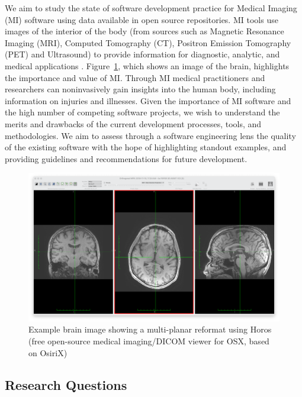 \documentclass[11pt]{article}
\begin{document}
We aim to study the state of software development practice for Medical Imaging
(MI) software using data available in open source repositories.  MI tools use
images of the interior of the body (from sources such as Magnetic Resonance
Imaging (MRI), Computed Tomography (CT), Positron Emission Tomography (PET) and
Ultrasound) to provide information for diagnostic, analytic, and medical
applications \cite{FDA2021, enwiki:1034887445, Zhang2008}.
Figure~\ref{Fig_Example}, which shows an image of the brain, highlights the
importance and value of MI. Through MI medical practitioners and researchers can
noninvasively gain insights into the human body, including information on
injuries and illnesses. Given the importance of MI software and the high number
of competing software projects, we wish to understand the merits and drawbacks
of the current development processes, tools, and methodologies. We aim to assess
through a software engineering lens the quality of the existing software with
the hope of highlighting standout examples, and providing guidelines and
recommendations for future development.

\begin{figure}[!ht]
    \begin{center}
        \includegraphics[scale=0.25]{MPR.png}        
    \end{center}
    \caption{Example brain image showing a multi-planar reformat using Horos
	(free open-source medical imaging/DICOM viewer for OSX, based on OsiriX)}
    \label{Fig_Example}
\end{figure}

\subsection{Research Questions} \label{sec_motivation}
\end{document}
